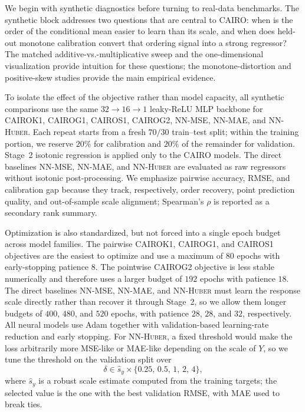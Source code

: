 \providecommand{\MonotoneFigureDirPatched}{../results/benchmarks/monotone_distortion_neural_full_g2patched/figures}
\providecommand{\PositiveSkewFigureDirPatched}{../results/benchmarks/positive_skew_study_g2patched/figures}
\providecommand{\MatchedErrorFigureDirFull}{../results/benchmarks/matched_error_study_full/figures}
\providecommand{\MatchedErrorFigureDirVis}{../paper/figures}

We begin with synthetic diagnostics before turning to real-data benchmarks. The synthetic block addresses two questions that are central to \textsc{CAIRO}: when is the order of the conditional mean easier to learn than its scale, and when does held-out monotone calibration convert that ordering signal into a strong regressor? The matched additive-vs.-multiplicative sweep and the one-dimensional visualization provide intuition for these questions; the monotone-distortion and positive-skew studies provide the main empirical evidence.

To isolate the effect of the objective rather than model capacity, all synthetic comparisons use the same $32 \rightarrow 16 \rightarrow 1$ leaky-ReLU MLP backbone for \textsc{CAIROK1}, \textsc{CAIROG1}, \textsc{CAIROS1}, \textsc{CAIROG2}, \textsc{NN-MSE}, \textsc{NN-MAE}, and \textsc{NN-Huber}. Each repeat starts from a fresh $70/30$ train--test split; within the training portion, we reserve $20\%$ for calibration and $20\%$ of the remainder for validation. Stage~2 isotonic regression is applied only to the \textsc{CAIRO} models. The direct baselines \textsc{NN-MSE}, \textsc{NN-MAE}, and \textsc{NN-Huber} are evaluated as raw regressors without isotonic post-processing. We emphasize pairwise accuracy, RMSE, and calibration gap because they track, respectively, order recovery, point prediction quality, and out-of-sample scale alignment; Spearman's $\rho$ is reported as a secondary rank summary.

Optimization is also standardized, but not forced into a single epoch budget across model families. The pairwise \textsc{CAIROK1}, \textsc{CAIROG1}, and \textsc{CAIROS1} objectives are the easiest to optimize and use a maximum of $80$ epochs with early-stopping patience $8$. The pointwise \textsc{CAIROG2} objective is less stable numerically and therefore uses a larger budget of $192$ epochs with patience $18$. The direct baselines \textsc{NN-MSE}, \textsc{NN-MAE}, and \textsc{NN-Huber} must learn the response scale directly rather than recover it through Stage~2, so we allow them longer budgets of $400$, $480$, and $520$ epochs, with patience $28$, $28$, and $32$, respectively. All neural models use Adam together with validation-based learning-rate reduction and early stopping. For \textsc{NN-Huber}, a fixed threshold would make the loss arbitrarily more MSE-like or MAE-like depending on the scale of \(Y\), so we tune the threshold on the validation split over
\[
\delta \in \hat{s}_y \times \{0.25,\,0.5,\,1,\,2,\,4\},
\]
where \(\hat{s}_y\) is a robust scale estimate computed from the training targets; the selected value is the one with the best validation RMSE, with MAE used to break ties.

